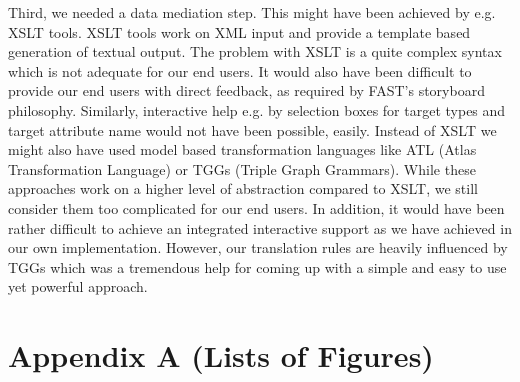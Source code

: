 \documentclass{fast_latex}
\begin{document}
Third, we needed a data mediation step. This might have been achieved by e.g. XSLT tools. XSLT tools work on 
XML input and provide a template based generation of textual output. The problem with XSLT is a quite 
complex syntax which is not adequate for our end users. It would also have been difficult to provide our end users with direct feedback, as required by FAST's storyboard philosophy. Similarly, interactive help e.g. by selection boxes for target types and target attribute name would not have been possible, easily. Instead of XSLT we might also have used model based transformation languages like ATL (Atlas Transformation Language) or TGGs (Triple Graph Grammars). While these approaches work on a higher level of abstraction compared to XSLT, we still consider them too complicated for our end users. 
In addition, it would have been rather difficult to achieve an integrated interactive support as we have achieved in our 
own implementation. However, our translation rules are heavily influenced by TGGs which was a tremendous help 
for coming up with a simple and easy to use yet powerful approach. 


\clearpage



\clearpage
\doublespacing
\section*{Appendix A (Lists of Figures)}


\listoffigures
\end{document}
